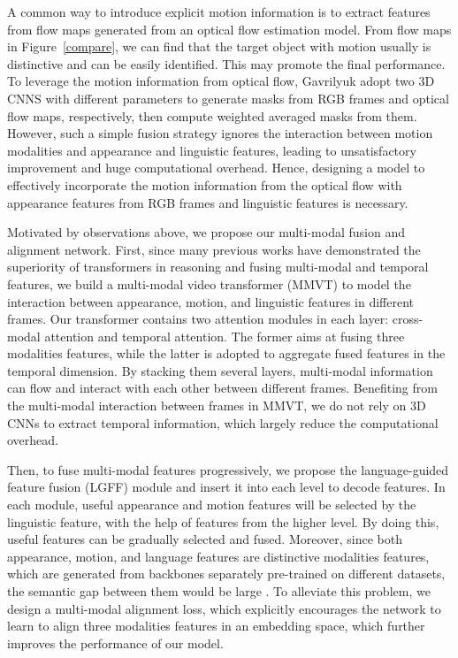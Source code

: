 \documentclass[10pt,twocolumn,letterpaper]{article}
\begin{document}
A common way to introduce explicit motion information is to extract features from flow maps generated from an optical flow estimation model. From flow maps in Figure~\ref{compare}, we can find that the target object with motion usually is distinctive and can be easily identified. This may promote the final performance. To leverage the motion information from optical flow, Gavrilyuk \etal \cite{gavrilyuk2018actor} adopt two 3D CNNS with different parameters to generate masks from RGB frames and optical flow maps, respectively, then compute weighted averaged masks from them. However, such a simple fusion strategy ignores the interaction between motion modalities and appearance and linguistic features, leading to unsatisfactory improvement and huge computational overhead. Hence, designing a model to effectively incorporate the motion information from the optical flow with appearance features from RGB frames and linguistic features is necessary.



Motivated by observations above, we propose our multi-modal fusion and alignment network. First, since many previous works \cite{chen2021mm, hu2021unit, bertasius2021space, arnab2021vivit} have demonstrated the superiority of transformers in reasoning and fusing multi-modal and temporal features, we build a multi-modal video transformer (MMVT) to model the interaction between appearance, motion, and linguistic features in different frames. Our transformer contains two attention modules in each layer: cross-modal attention and temporal attention. The former aims at fusing three modalities features, while the latter is adopted to aggregate fused features in the temporal dimension. By stacking them several layers, multi-modal information can flow and interact with each other between different frames. Benefiting from the multi-modal interaction between frames in MMVT, we do not rely on 3D CNNs to extract temporal information, which largely reduce the computational overhead. 


Then, to fuse multi-modal features progressively, we propose the language-guided feature fusion (LGFF) module and insert it into each level to decode features. In each module, useful appearance and motion features will be selected by the linguistic feature, with the help of features from the higher level. By doing this, useful features can be gradually selected and fused. Moreover, since both appearance, motion, and language features are distinctive modalities features, which are generated from backbones separately pre-trained on different datasets, the semantic gap between them would be large \cite{huang2020pixel}. To alleviate this problem, we design a multi-modal alignment loss, which explicitly encourages the network to learn to align three modalities features in an embedding space, which further improves the performance of our model. 
\end{document}
